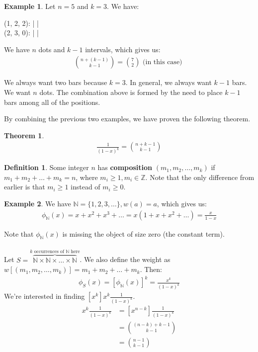 \documentclass[]{article}
\newtheorem{theorem}{Theorem}[section]
\theoremstyle{definition}
\newtheorem{defn}{Definition}[section]
\newtheorem{ex}{Example}[section]
\newcommand{\lecture}[1]{\marginpar{{\footnotesize $\leftarrow$ \underline{#1}}}}
\begin{document}
				\begin{ex}
					Let $n = 5$ and $k = 3$. We have:

					\begin{center}
						(1, 2, 2): \textbullet{} | \textbullet{} \textbullet{} | \textbullet{} \textbullet{} \\
						(2, 3, 0): \textbullet{} \textbullet{} | \textbullet{} \textbullet{} \textbullet{} |
					\end{center}

					We have $n$ dots and $k-1$ intervals, which gives us:
					\begin{align*}
						{n + (k - 1) \choose k - 1} = {7 \choose 2} \text{ (in this case) }
					\end{align*}

					We always want two bars because $k = 3$. In general, we always want $k - 1$ bars. We want $n$ dots. The combination above is formed by the need to place $k - 1$ bars among all of the positions.
				\end{ex}
				By combining the previous two examples, we have proven the following theorem.
				\begin{theorem}
					\begin{align*}
						[x^n] \frac{1}{(1 - x)^k} = {n + k - 1 \choose k - 1}
					\end{align*}
				\end{theorem}

				\begin{defn}
					Some integer $n$ has \textbf{composition} $(m_1, m_2, \ldots, m_k)$ if $m_1 + m_2 + \ldots + m_k = n$, where $m_i \ge 1, m_i \in \mathbb{Z}$. Note that the only difference from earlier is that $m_i \ge 1$ instead of $m_i \ge 0$.
				\end{defn}
				
				\begin{ex}
					We have $\mathbb{N} = \{1, 2, 3, \ldots \}, w(a) = a$, which gives us:
					\begin{align*}
						\phi_{\mathbb{N}}(x) = x + x^2 + x^3 + \ldots = x(1 + x + x^2 + \ldots) = \frac{x}{1 - x}
					\end{align*}

					Note that $\phi_{\mathbb{N}}(x)$ is missing the object of size zero (the constant term).
					\\ \\
					Let $S = \overbrace{\mathbb{N} \times \mathbb{N} \times \ldots \times \mathbb{N}}^{k \text{ occurrences of } \mathbb{N} \text{ here}}$. We also define the weight as $w[(m_1, m_2, \ldots, m_k)] = m_1 + m_2 + \ldots + m_k$. Then:
					\begin{align*}
						\phi_S(x) = [\phi_{\mathbb{N}}(x)]^k = \frac{x^k}{(1 - x)^k}
					\end{align*}
					\lecture{January 21, 2013}
					We're interested in finding $[x^k]x^k \frac{1}{(1 - x)^k}$.
					\begin{align*}
						[x^n]x^k \frac{1}{(1 - x)^k} &= [x^{n-k}] \frac{1}{(1 - x)^k} \\
						&= {(n - k) + k - 1 \choose k - 1} \\
						&= {n - 1 \choose k - 1}
					\end{align*}
				\end{ex}
\end{document}
